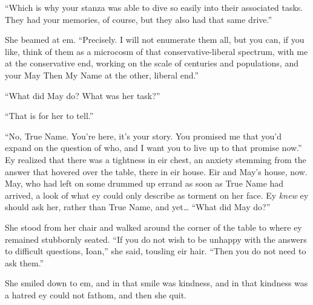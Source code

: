 ``Which is why your stanza was able to dive so easily into their associated tasks. They had your memories, of course, but they also had that same drive.''

She beamed at em. ``Precisely. I will not enumerate them all, but you can, if you like, think of them as a microcosm of that conservative-liberal spectrum, with me at the conservative end, working on the scale of centuries and populations, and your May Then My Name at the other, liberal end.''

``What did May do? What was her task?''

``That is for her to tell.''

``No, True Name. You're here, it's your story. You promised me that you'd expand on the question of who, and I want you to live up to that promise now.'' Ey realized that there was a tightness in eir chest, an anxiety stemming from the answer that hovered over the table, there in eir house. Eir and May's house, now. May, who had left on some drummed up errand as soon as True Name had arrived, a look of what ey could only describe as torment on her face. Ey \emph{knew} ey should ask her, rather than True Name, and yet\ldots{} ``What did May do?''

She stood from her chair and walked around the corner of the table to where ey remained stubbornly seated. ``If you do not wish to be unhappy with the answers to difficult questions, Ioan,'' she said, tousling eir hair. ``Then you do not need to ask them.''

She smiled down to em, and in that smile was kindness, and in that kindness was a hatred ey could not fathom, and then she quit.
